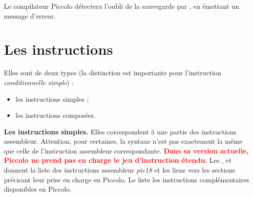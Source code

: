 Le compilateur Piccolo détectera l’oubli de la sauvegarde par , en émettant un message d’erreur.


\section{Les instructions}

Elles sont de deux types (la distinction est importante pour l’instruction \emph{conditionnelle simple}) :
\begin{itemize}
  \item les instructions simples ;
  \item les instructions composées.

\end{itemize}


\textbf{Les instructions simples.} Elles correspondent à une partie des instructions assembleur. Attention, pour certaines, la syntaxe n'est pas exactement la même que celle de l'instruction assembleur correspondante. \textcolor{red}{\bf Dans sa version actuelle, Piccolo ne prend pas en charge le jeu d'instruction étendu.} Les ,   et  donnent la liste des instructions assembleur \emph{pic18} et les liens vers les sections précisant leur prise en charge en Piccolo. Le  liste les instructions complémentaires disponibles en Piccolo.
 

